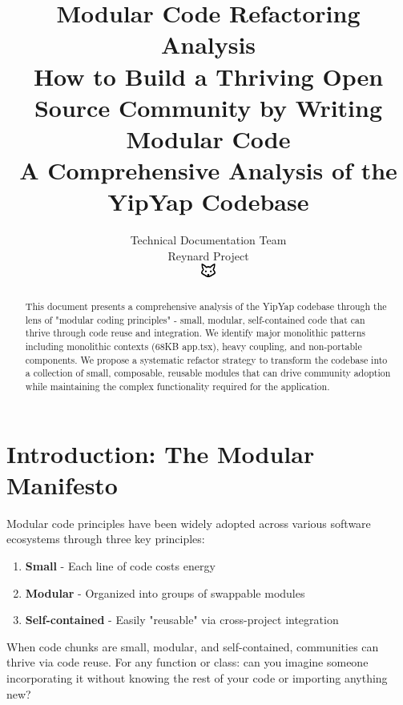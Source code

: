 \documentclass[11pt]{article}
\begin{document}
\title{\textbf{Modular Code Refactoring Analysis} \\
\Large{How to Build a Thriving Open Source Community by Writing Modular Code} \\
\large{A Comprehensive Analysis of the YipYap Codebase}}

\author{Technical Documentation Team\\
Reynard Project\\
\includegraphics[width=0.5cm]{../../shared-assets/favicon.pdf}}

\maketitle

\begin{abstract}
This document presents a comprehensive analysis of the YipYap codebase through the lens of "modular coding principles" - small, modular, self-contained code that can thrive through code reuse and integration. We identify major monolithic patterns including monolithic contexts (68KB app.tsx), heavy coupling, and non-portable components. We propose a systematic refactor strategy to transform the codebase into a collection of small, composable, reusable modules that can drive community adoption while maintaining the complex functionality required for the application.
\end{abstract}

\tableofcontents
\newpage

\section{Introduction: The Modular Manifesto}

Modular code principles have been widely adopted across various software ecosystems through three key principles:

\begin{enumerate}
\item \textbf{Small} - Each line of code costs energy
\item \textbf{Modular} - Organized into groups of swappable modules  
\item \textbf{Self-contained} - Easily "reusable" via cross-project integration
\end{enumerate}

When code chunks are small, modular, and self-contained, communities can thrive via code reuse. For any function or class: can you imagine someone incorporating it without knowing the rest of your code or importing anything new?
\end{document}
